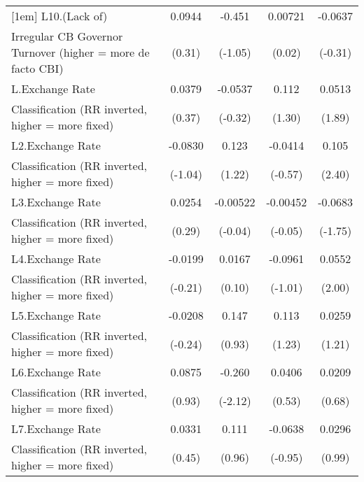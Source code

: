 {\begin{tabular}{l*{4}{c}}
[1em]
L10.(Lack of)       &      0.0944         &      -0.451         &     0.00721         &     -0.0637         \\
Irregular CB Governor Turnover (higher = more de facto CBI)&      (0.31)         &     (-1.05)         &      (0.02)         &     (-0.31)         \\
[1em]
L.Exchange Rate     &      0.0379         &     -0.0537         &       0.112         &      0.0513         \\
Classification (RR inverted, higher = more fixed)&      (0.37)         &     (-0.32)         &      (1.30)         &      (1.89)         \\
[1em]
L2.Exchange Rate    &     -0.0830         &       0.123         &     -0.0414         &       0.105\sym{*}  \\
Classification (RR inverted, higher = more fixed)&     (-1.04)         &      (1.22)         &     (-0.57)         &      (2.40)         \\
[1em]
L3.Exchange Rate    &      0.0254         &    -0.00522         &    -0.00452         &     -0.0683         \\
Classification (RR inverted, higher = more fixed)&      (0.29)         &     (-0.04)         &     (-0.05)         &     (-1.75)         \\
[1em]
L4.Exchange Rate    &     -0.0199         &      0.0167         &     -0.0961         &      0.0552\sym{*}  \\
Classification (RR inverted, higher = more fixed)&     (-0.21)         &      (0.10)         &     (-1.01)         &      (2.00)         \\
[1em]
L5.Exchange Rate    &     -0.0208         &       0.147         &       0.113         &      0.0259         \\
Classification (RR inverted, higher = more fixed)&     (-0.24)         &      (0.93)         &      (1.23)         &      (1.21)         \\
[1em]
L6.Exchange Rate    &      0.0875         &      -0.260\sym{*}  &      0.0406         &      0.0209         \\
Classification (RR inverted, higher = more fixed)&      (0.93)         &     (-2.12)         &      (0.53)         &      (0.68)         \\
[1em]
L7.Exchange Rate    &      0.0331         &       0.111         &     -0.0638         &      0.0296         \\
Classification (RR inverted, higher = more fixed)&      (0.45)         &      (0.96)         &     (-0.95)         &      (0.99)         \\

\end{tabular}}
